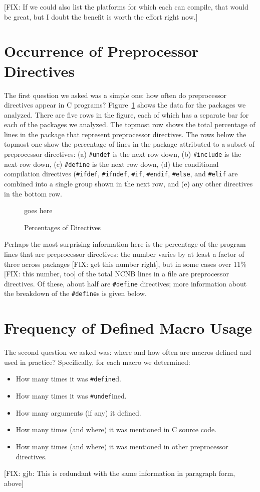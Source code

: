 [FIX: If we could also list the platforms for which each can compile,
that would be great, but I doubt the benefit is worth the effort right
now.]

\section{Occurrence of Preprocessor Directives}\label{sec:directives}

The first question we asked was a simple one: how often do
preprocessor directives appear in C programs?
Figure~\ref{fig:directives} shows the data for the packages we
analyzed.  There are five rows in the figure, each of which has a
separate bar for each of the packages we analyzed.  The topmost row
shows the total percentage of lines in the package that represent
preprocessor directives.  The rows below the topmost one show the
percentage of lines in the package attributed to a subset of
preprocessor directives: (a) \verb+#undef+ is the next row down, (b)
\verb+#include+ is the next row down, (c) \verb+#define+ is the next
row down, (d) the conditional compilation directives (\verb+#ifdef+,
\verb+#ifndef+, \verb+#if+, \verb+#endif+, \verb+#else+, and
\verb+#elif+ are combined into a single group shown in the next row,
and (e) any other directives in the bottom row. 

\begin{figure}
goes here

\caption{Percentages of Directives\label{fig:directives}}
\end{figure}

Perhaps the most surprising information here is the percentage of the
program lines that are preprocessor directives: the number varies by
at least a factor of three across packages [FIX: get this number
right], but in some cases over 11\% [FIX: this number, too] of the
total NCNB lines in a file are preprocessor directives.  Of these,
about half are \verb+#define+ directives; more information about the
breakdown of the \verb+#define+s is given below.

\section{Frequency of Defined Macro Usage}\label{sec:usage}

The second question we asked was: where and how often are macros
defined and used in practice?  Specifically, for each macro we
determined:
\begin{itemize}

\item How many times it was \verb+#define+d.
\item How many times it was \verb+#undef+ined.
\item How many arguments (if any) it defined.
\item How many times (and where) it was mentioned in C source code.
\item How many times (and where) it was mentioned in other
preprocessor directives.

\end{itemize}
[FIX: gjb: This is redundant with the same information in paragraph
form, above]

